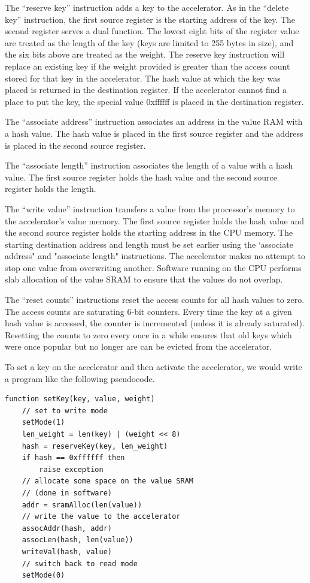The ``reserve key'' instruction adds a key to the accelerator. As in the
``delete key'' instruction, the first source register is the starting address
of the key. The second register serves a dual function. The lowest eight
bits of the register value are treated as the length of the key (keys are
limited to 255 bytes in size), and the six bits above are treated as the
weight. The reserve key instruction will replace an existing key if the
weight provided is greater than the access count stored for that key in the
accelerator. The hash value at which the key was placed is returned in the
destination register. If the accelerator cannot find a place to put the key,
the special value 0xffffff is placed in the destination register.

The ``associate address'' instruction associates an address in the value RAM
with a hash value. The hash value is placed in the first source register and
the address is placed in the second source register.

The ``associate length'' instruction associates the length of a value with a hash
value. The first source register holds the hash value and the second source
register holds the length.

The ``write value'' instruction transfers a value from the processor's memory to
the accelerator's value memory. The first source register holds the hash value
and the second source register holds the starting address in the CPU memory.
The starting destination address and length must be set earlier using the
`associate address" and "associate length" instructions. The accelerator makes
no attempt to stop one value from overwriting another. Software running on the
CPU performs slab allocation of the value SRAM to ensure that the values do
not overlap.

The ``reset counts'' instructions reset the access counts for all hash values
to zero. The access counts are saturating 6-bit counters. Every time the key
at a given hash value is accessed, the counter is incremented (unless it is
already saturated). Resetting the counts to zero every once in a while ensures
that old keys which were once popular but no longer are can be evicted from
the accelerator.

To set a key on the accelerator and then activate the accelerator, we would
write a program like the following pseudocode.

{\footnotesize
\begin{verbatim}
function setKey(key, value, weight)
    // set to write mode
    setMode(1)
    len_weight = len(key) | (weight << 8)
    hash = reserveKey(key, len_weight)
    if hash == 0xffffff then
        raise exception
    // allocate some space on the value SRAM
    // (done in software)
    addr = sramAlloc(len(value))
    // write the value to the accelerator
    assocAddr(hash, addr)
    assocLen(hash, len(value))
    writeVal(hash, value)
    // switch back to read mode
    setMode(0)
\end{verbatim}
}
